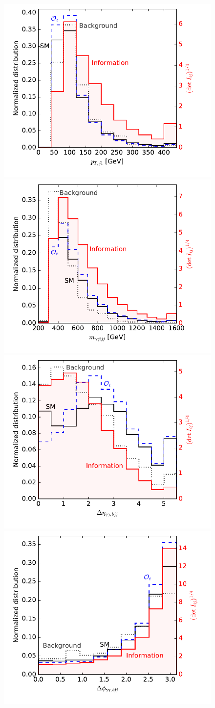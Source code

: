\begin{figure}
  \includegraphics[width=0.49 \textwidth,clip=true,trim=0.4cm 0.6cm 0.4cm 0.0cm]{fig/information/th_information_over_ptj}%
  \includegraphics[width=0.49 \textwidth,clip=true,trim=0.4cm 0.6cm 0.4cm 0.0cm]{fig/information/th_information_over_maabjj}\\%
  \includegraphics[width=0.49 \textwidth,clip=true,trim=0.4cm 0.6cm 0.4cm 0.0cm]{fig/information/th_information_over_deltaeta}%
  \includegraphics[width=0.49 \textwidth,clip=true,trim=0.4cm 0.6cm 0.4cm 0.0cm]{fig/information/th_information_over_deltaphi}%

\end{figure}
